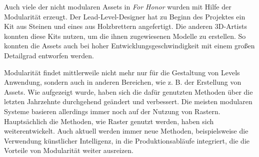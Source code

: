 Auch viele der nicht modularen Assets in \textit{For Honor} wurden mit Hilfe der Modularität erzeugt. Der Lead-Level-Designer hat zu Beginn des Projektes ein Kit aus Steinen und eines aus Holzbrettern angefertigt. Die anderen 3D-Artists konnten diese Kits nutzen, um die ihnen zugewiesenen Modelle zu erstellen. So konnten die Assets auch bei hoher Entwicklungsgeschwindigkeit mit einem großen Detailgrad entworfen werden. \parencite{ForHonor}
\par
Modularität findet mittlerweile nicht mehr nur für die Gestaltung von Levels Anwendung, sondern auch in anderen Bereichen, wie z. B. der Erstellung von Assets. Wie aufgezeigt wurde, haben sich die dafür genutzten Methoden über die letzten Jahrzehnte durchgehend geändert und verbessert. Die meisten modularen Systeme basieren allerdings immer noch auf der Nutzung von Rastern. Hauptsächlich die Methoden, wie Raster genutzt werden, haben sich weiterentwickelt. Auch aktuell werden immer neue Methoden, beispielsweise die Verwendung künstlicher Intelligenz, in die Produktionsabläufe integriert, die die Vorteile von Modularität weiter ausreizen.
\newpage
